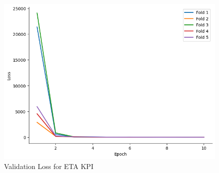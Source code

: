 \documentclass{report} %
\begin{document}
\begin{figure}[H]
\begin{minipage}[b]{0.325\textwidth}
        \includegraphics[width=\textwidth]{./ReportImages/val_loss_y2.png}
        \caption{\centering Validation Loss for ETA \ac{KPI}}
        \label{fig:Validation Loss for ETA grid}
    \end{minipage}
\end{figure}
\end{document}

